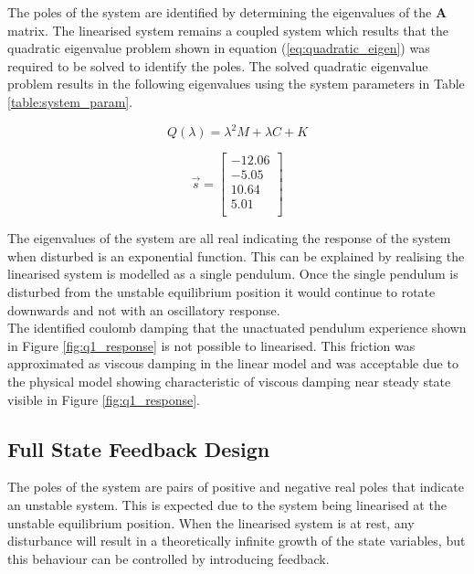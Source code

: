 The poles of the system are identified by determining the eigenvalues of the $\boldsymbol{A}$ matrix. The linearised system remains a coupled system which results that the quadratic eigenvalue problem shown in equation (\ref{eq:quadratic_eigen}) was required to be solved to identify the poles. The solved quadratic eigenvalue problem results in the following eigenvalues using the system parameters in Table \ref{table:system_param}.

\begin{equation} \label{eq:quadratic_eigen}
Q(\lambda) =\lambda^{2}M + \lambda C + K
\end{equation}

$$
\vec{s} = 
\begin{bmatrix}
-12.06 \\
-5.05 \\
10.64 \\
5.01 \\
\end{bmatrix}
$$

The eigenvalues of the system are all real indicating the response of the system when disturbed is an exponential function. This can be explained by realising the linearised system is modelled as a single pendulum. Once the single pendulum is disturbed from the unstable equilibrium position it would continue to rotate downwards and not with an oscillatory response.\\

The identified coulomb damping that the unactuated pendulum experience shown in Figure \ref{fig:q1_response} is not possible to linearised. This friction was approximated as viscous damping in the linear model and was acceptable due to the physical model showing characteristic of viscous damping near steady state visible in Figure \ref{fig:q1_response}.


\subsection{Full State Feedback Design}
\label{sec:statespace_feedback}
The poles of the system are pairs of positive and negative real poles that indicate an unstable system. This is expected due to the system being linearised at the unstable equilibrium position. When the linearised system is at rest, any disturbance will result in a theoretically infinite growth of the state variables, but this behaviour can be controlled by introducing feedback. \\


